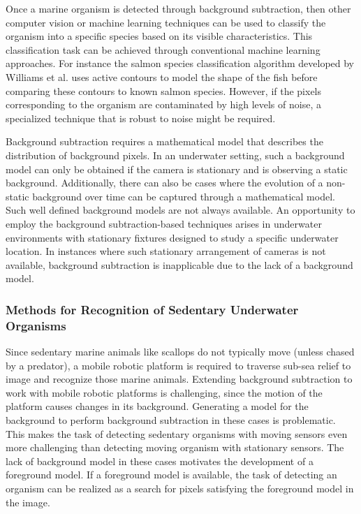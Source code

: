 \documentclass {udthesis}
\begin{document}
Once a marine organism is detected through background subtraction, then other computer vision or machine learning techniques can be used to classify the organism into a specific species based on its visible characteristics. This classification task can be achieved through conventional machine learning approaches. For instance the salmon species classification algorithm developed by Williams et al. \cite{williams} uses active contours to model the shape of the fish before comparing these contours to known salmon species. However, if the pixels corresponding to the organism are contaminated by high levels of noise, a specialized technique that is robust to noise might be required.

Background subtraction requires a mathematical model that describes the distribution of background pixels. In an underwater setting, such a background model can only be obtained if the camera is stationary and is observing a static background. Additionally, there can also be cases where the evolution of a non-static background over time can be captured through a mathematical model. Such well defined background models are not always available. An opportunity to employ the background subtraction-based techniques arises in underwater environments with stationary fixtures designed to study a specific underwater location. In instances where such stationary arrangement of cameras is not available, background subtraction is inapplicable due to the lack of a background model.


\subsubsection{Methods for Recognition of Sedentary Underwater Organisms}

Since sedentary marine animals like scallops do not typically move (unless chased by a predator), a mobile robotic platform is required to traverse sub-sea relief to image and recognize those marine animals. Extending background subtraction to work with mobile robotic platforms is challenging, since the motion of the platform causes changes in its background. Generating a model for the background to perform background subtraction in these cases is problematic. This makes the task of detecting sedentary organisms with moving sensors even more challenging than detecting moving organism with stationary sensors. The lack of background model in these cases motivates the development of a foreground model. If a foreground model is available, the task of detecting an organism can be realized as a search for pixels satisfying the foreground model in the image.
\end{document}
